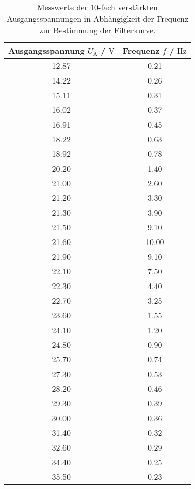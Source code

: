 \begin{table}
    \caption{Messwerte der 10-fach verstärkten Ausgangsspannungen in Abhängigkeit der Frequenz zur Bestimmung der Filterkurve.}
    \centering
    \label{tab:filterkurvewerte}
    \begin{tabular}{c c }
        \toprule
        Ausgangsspannung $U_{\text{A}}$ / $\si{\volt}$ & Frequenz $f$ / $\si{\hertz}$ \\
        \midrule
        12.87  &         0.21\\
        14.22  &         0.26\\
        15.11  &         0.31\\
        16.02  &         0.37\\
        16.91  &         0.45\\
        18.22  &         0.63\\
        18.92  &         0.78\\
        20.20  &         1.40\\
        21.00  &         2.60\\
        21.20  &         3.30\\
        21.30  &         3.90\\
        21.50  &         9.10\\
        21.60  &         10.00\\
        21.90  &         9.10\\
        22.10  &         7.50\\
        22.30  &         4.40\\
        22.70  &         3.25\\
        23.60  &         1.55\\
        24.10  &         1.20\\
        24.80  &         0.90\\
        25.70  &         0.74\\
        27.30  &         0.53\\
        28.20  &         0.46\\
        29.30  &         0.39\\
        30.00  &         0.36\\
        31.40  &         0.32\\
        32.60  &         0.29\\
        34.40  &         0.25\\
        35.50  &         0.23\\
        \bottomrule    
    \end{tabular}
\end{table}

